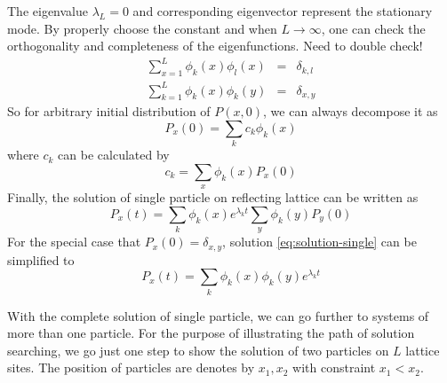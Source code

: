 \documentclass[12pt,a4paper]{article}
\begin{document}
The eigenvalue $\lambda_L = 0$ and corresponding eigenvector represent the
stationary mode. By properly choose the constant and when $L\rightarrow\infty$,
one can check the orthogonality and completeness of the eigenfunctions.
{\color{red} Need to double check!}
\begin{eqnarray}
    \label{eq:orthogonality}
    \sum_{x=1}^L \phi_k(x)\phi_l(x) & = & \delta_{k,l} \\
    \label{eq:completeness}
    \sum_{k=1}^L \phi_k(x)\phi_k(y) & = & \delta_{x,y} 
\end{eqnarray}
So for arbitrary initial distribution of $P(x, 0)$, we can always decompose it as 
\begin{equation}
    \label{eq:decompose-intial-single}
    P_x(0) = \sum_k{c_k \phi_k(x)}
\end{equation}
where $c_k$ can be calculated by 
\begin{equation}
    \label{eq:coeff-k}
    c_k = \sum_x{\phi_k(x) P_x(0)}
\end{equation}
Finally, the solution of single particle on reflecting lattice can be written as
\begin{equation}
    \label{eq:solution-single}
    P_x(t) = \sum_k{\phi_k(x)e^{\lambda_k t}}\sum_y{\phi_k(y)P_y(0)}
\end{equation}
For the special case that $P_x(0) = \delta_{x,y}$, solution
\eqref{eq:solution-single} can be simplified to
\begin{equation}
    \label{eq:solution-single-simplified}
    P_x(t) = \sum_k{\phi_k(x)\phi_k(y)e^{\lambda_k t}}
\end{equation}

With the complete solution of single particle, we can go further to systems of
more than one particle. For the purpose of illustrating the path of solution
searching, we go just one step to show the solution of two particles on $L$
lattice sites. The position of particles are denotes by $x_1, x_2$ with
constraint $x_1<x_2$.





% 
 
\end{document}
